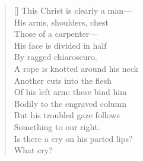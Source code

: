 \begin{verse}[\versewidth]
This Christ is clearly a man---\\
His arms, shoulders, chest\\
Those of a carpenter---\\
His face is divided in half\\
By ragged chiaroscuro.\\
A rope is knotted around his neck\\
Another cuts into the flesh\\
Of his left arm: these bind him\\
Bodily to the engraved column\\
But his troubled gaze follows\\
Something to our right.\\
Is there a cry on his parted lips?\\
What cry?
\end{verse}
